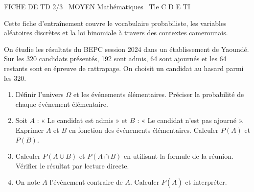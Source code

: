 \documentclass[11pt]{article}
\begin{document}
\begin{tcolorbox}[enhanced,colback=popink,colframe=popink,arc=10pt,boxrule=0pt,left=12pt,right=12pt,top=9pt,bottom=9pt]
{\color{white}\popxbold\small FICHE DE TD 2/3 \textbullet\ MOYEN \hfill Mathématiques \textbullet\ Tle C D E TI\par}
\end{tcolorbox}
\vspace{4pt}
Cette fiche d'entraînement couvre le vocabulaire probabiliste, les variables aléatoires discrètes et la loi binomiale à travers des contextes camerounais.

\begin{exercice}
On étudie les résultats du BEPC session 2024 dans un établissement de Yaoundé. Sur les \num{320} candidats présentés, \num{192} sont admis, \num{64} sont ajournés et les \num{64} restants sont en épreuve de rattrapage. On choisit un candidat au hasard parmi les \num{320}.
\begin{enumerate}
    \item Définir l'univers $\Omega$ et les événements élémentaires. Préciser la probabilité de chaque événement élémentaire.
    \item Soit $A$ : « Le candidat est admis » et $B$ : « Le candidat n'est pas ajourné ». Exprimer $A$ et $B$ en fonction des événements élémentaires. Calculer $P(A)$ et $P(B)$.
    \item Calculer $P(A \cup B)$ et $P(A \cap B)$ en utilisant la formule de la réunion. Vérifier le résultat par lecture directe.
    \item On note $\overline{A}$ l'événement contraire de $A$. Calculer $P(\overline{A})$ et interpréter.
\end{enumerate}
\end{exercice}
\end{document}
